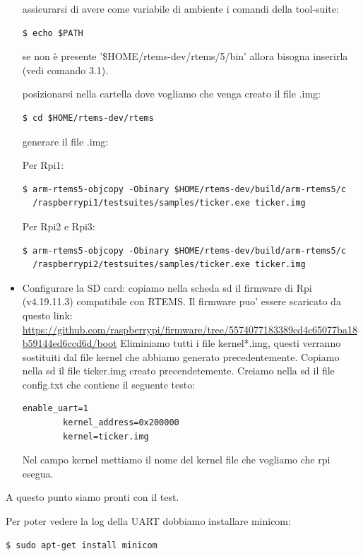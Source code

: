 \documentclass[12pt, a4paper]{article}
\begin{document}
\begin{flushleft}
\begin{itemize}
assicurarsi di avere come variabile di ambiente i comandi della tool-suite:
\begin{lstlisting}[style=BashStyle] 
$ echo $PATH
\end{lstlisting}
se non è presente  '\$HOME/rtems-dev/rtems/5/bin' allora bisogna inserirla (vedi comando 3.1).

posizionarsi nella cartella dove vogliamo che venga creato il file .img:
\begin{lstlisting}[style=BashStyle] 
$ cd $HOME/rtems-dev/rtems 
\end{lstlisting}		

generare il file .img:

Per Rpi1: 
\begin{lstlisting}[style=BashStyle] 
$ arm-rtems5-objcopy -Obinary $HOME/rtems-dev/build/arm-rtems5/c 
  /raspberrypi1/testsuites/samples/ticker.exe ticker.img
\end{lstlisting}
Per Rpi2 e Rpi3: 
\begin{lstlisting}[style=BashStyle ] 
$ arm-rtems5-objcopy -Obinary $HOME/rtems-dev/build/arm-rtems5/c
  /raspberrypi2/testsuites/samples/ticker.exe ticker.img
\end{lstlisting}

\item Configurare la SD card:
copiamo nella scheda sd il firmware di Rpi (v4.19.11.3) compatibile con RTEMS. 
Il firmware puo' essere scaricato da questo link:  \\
\small\url{https://github.com/raspberrypi/firmware/tree/5574077183389cd4c65077ba18b59144ed6ccd6d/boot}
Eliminiamo tutti i file kernel*.img, questi verranno sostituiti dal file 
kernel che abbiamo generato precedentemente.
Copiamo nella sd il file ticker.img creato precendetemente.
Creiamo nella sd il file config.txt che contiene il seguente testo:
\begin{lstlisting}[style=BashStyle ] 
		enable_uart=1
		kernel_address=0x200000
 		kernel=ticker.img 
\end{lstlisting}
Nel campo kernel mettiamo il nome del kernel file che vogliamo che rpi esegua.
\end{itemize}
	
\newpage
 	 
A questo punto siamo pronti con il test.

Per poter vedere la log della UART dobbiamo installare minicom:
\begin{lstlisting}[style=BashStyle] 
$ sudo apt-get install minicom
\end{lstlisting}


\end{flushleft}
\end{document}
